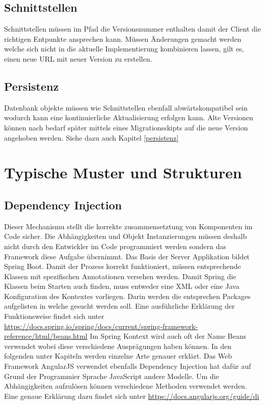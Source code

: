 \subsection{Schnittstellen}

Schnittstellen müssen im Pfad die Versionsnummer enthalten damit der Client die richtigen Entpunkte ansprechen kann. Müssen Änderungen gemacht werden welche sich nicht in die aktuelle Implementierung kombinieren lassen, gilt es, einen neue URL mit neuer Version zu erstellen.

\subsection{Persistenz}

Datenbank objekte müssen wie Schnittstellen ebenfall abwärtskompatibel sein wodurch kann eine kontinuierliche Aktualisierung erfolgen kann. Alte Versionen können nach bedarf später mittels eines Migrationsskipts auf die neue Version angehoben werden. Siehe dazu auch Kapitel \ref{persistenz}

\section{Typische Muster und Strukturen}

\subsection{Dependency Injection}

Dieser Mechanismu stellt die korrekte zusammensetztung von Komponenten im Code sicher. Die Abhängigkeiten und Objekt Instanzierungen  müssen deshalb nicht durch den Entwickler im Code programmiert werden sondern das Framework diese Aufgabe übernimmt. Das Basis der Server Applikation bildet Spring Boot. Damit der Prozess korrekt funktioniert,
müssen entsprechende Klassen mit spezifischen Annotationen versehen werden. 
Damit Spring die Klassen beim Starten auch finden, muss entweder eine XML oder eine Java Konfiguration des Kontextes vorliegen. Darin werden die entsprechen Packages aufgelisten in welche gesucht werden soll. Eine ausführliche Erklärung der Funktionsweise findet sich unter \url{https://docs.spring.io/spring/docs/current/spring-framework-reference/html/beans.html}\newline
Im Spring Kontext wird auch oft der Name Beans verwendet wobei diese verschiedene Ausprägungen haben können. In den folgenden unter Kapiteln werden einzelne Arte genauer erklärt.\newline
Das Web Framework AngularJS verwendet ebenfalls Dependency Injection hat dafür auf Grund der Programmier Sprache JavaScript andere Modelle. Um die Abhängigkeiten aufzulösen können verschiedene Methoden verwendet werden. Eine genaue Erklärung dazu findet sich unter \url{https://docs.angularjs.org/guide/di}

